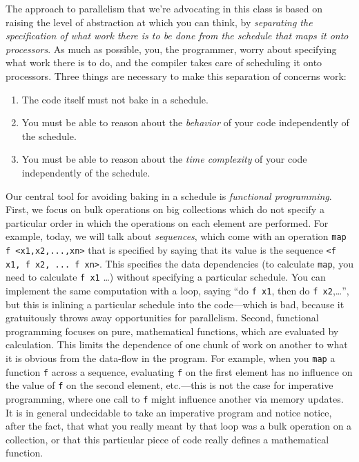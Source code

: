 The approach to parallelism that we're advocating in this class is based
on raising the level of abstraction at which you can think, by
\emph{separating the specification of what work there is to be done from
  the schedule that maps it onto processors}.  As much as possible, you,
the programmer, worry about specifying what work there is to do, and the
compiler takes care of scheduling it onto processors.  Three things are
necessary to make this separation of concerns work:
\begin{enumerate}
\item The code itself must not bake in a schedule.
\item You must be able to reason about the \emph{behavior} of your code
  independently of the schedule.
\item You must be able to reason about the \emph{time complexity} of
  your code independently of the schedule.
\end{enumerate}


Our central tool for avoiding baking in a schedule is \emph{functional
  programming}.  First, we focus on bulk operations on big collections
which do not specify a particular order in which the operations on each
element are performed.  For example, today, we will talk about
\emph{sequences}, which come with an operation
\verb|map f <x1,x2,...,xn>| that is specified by saying that its value
is the sequence \verb|<f x1, f x2, ... f xn>|.  This specifies the data
dependencies (to calculate \verb|map|, you need to calculate \verb|f x1|
\ldots) without specifying a particular schedule.  You can implement the
same computation with a loop, saying ``do \verb|f x1|, then do
\verb|f x2|,\ldots'', but this is inlining a particular schedule into
the code---which is bad, because it gratuitously throws away
opportunities for parallelism.  Second, functional programming focuses
on pure, mathematical functions, which are evaluated by calculation.
This limits the dependence of one chunk of work on another to what it is
obvious from the data-flow in the program.  For example, when you
\verb|map| a function \verb|f| across a sequence, evaluating \verb|f| on
the first element has no influence on the value of \verb|f| on the
second element, etc.---this is not the case for imperative programming,
where one call to \verb|f| might influence another via memory updates.
It is in general undecidable to take an imperative program and notice
notice, after the fact, that what you really meant by that loop was a
bulk operation on a collection, or that this particular piece of code
really defines a mathematical function.


